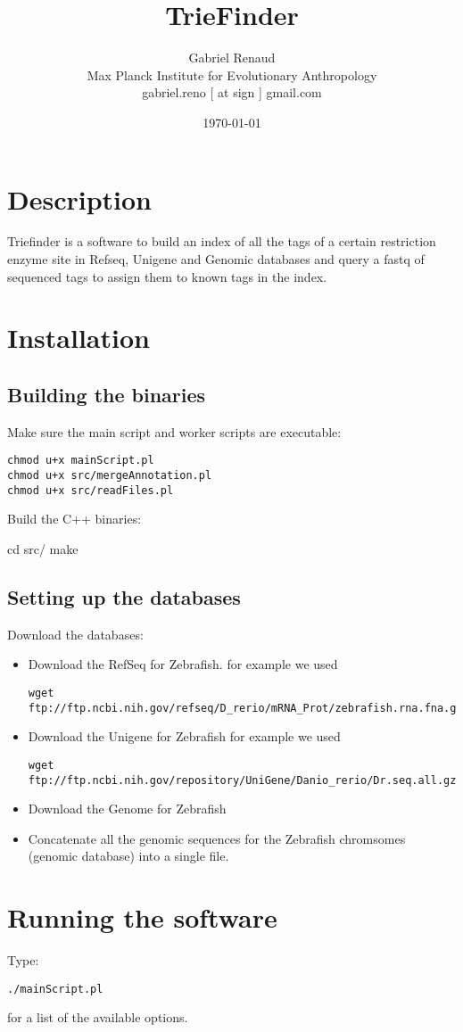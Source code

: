 \documentclass[a4paper,12pt]{article}
\begin{document}
\title{TrieFinder}
\author{Gabriel Renaud \\ \footnotesize{ Max Planck Institute for Evolutionary Anthropology} \\ \footnotesize{gabriel.reno [ at sign ] gmail.com}}
\date{\today}
\maketitle

\tableofcontents

\section{Description}
Triefinder is a software to build an index of all the tags of a certain restriction enzyme site in Refseq, Unigene and Genomic databases and query a fastq of sequenced tags to assign them to known tags in the index.

\section{Installation}

\subsection{Building the binaries}

Make sure the main script and worker scripts are executable:
\small{
\begin{verbatim}
chmod u+x mainScript.pl
chmod u+x src/mergeAnnotation.pl
chmod u+x src/readFiles.pl
\end{verbatim}
}

Build the C++ binaries:

cd src/
make


\subsection{Setting up the databases}
Download the databases:

\begin{itemize}
\item Download the RefSeq for Zebrafish.
for example we used 
\small{
\begin{verbatim}
wget ftp://ftp.ncbi.nih.gov/refseq/D_rerio/mRNA_Prot/zebrafish.rna.fna.gz
\end{verbatim}
}
\item Download the Unigene for Zebrafish
for example we used 
\small{
\begin{verbatim}
wget ftp://ftp.ncbi.nih.gov/repository/UniGene/Danio_rerio/Dr.seq.all.gz
\end{verbatim}
}

\item Download the Genome for Zebrafish

\item Concatenate all the genomic sequences for the Zebrafish chromsomes (genomic database) into a single file.
\end{itemize}

\section{Running the software}


Type:
\small{
\begin{verbatim}
./mainScript.pl
\end{verbatim}
}

for a list of the available options.
\end{document}
